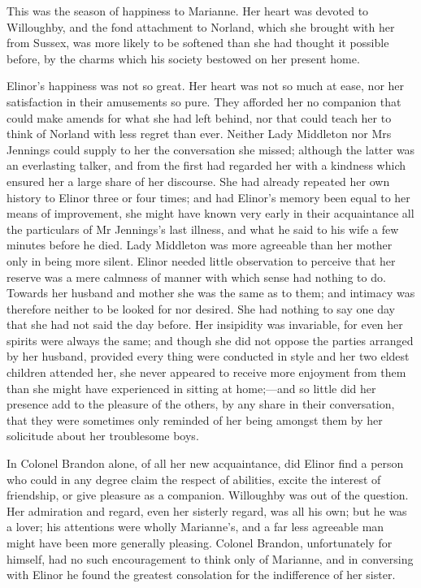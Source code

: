 This was the season of happiness to Marianne. Her heart was devoted to Willoughby, and the fond attachment to Norland, which she brought with her from Sussex, was more likely to be softened than she had thought it possible before, by the charms which his society bestowed on her present home.

Elinor's happiness was not so great. Her heart was not so much at ease, nor her satisfaction in their amusements so pure. They afforded her no companion that could make amends for what she had left behind, nor that could teach her to think of Norland with less regret than ever. Neither Lady Middleton nor Mrs Jennings could supply to her the conversation she missed; although the latter was an everlasting talker, and from the first had regarded her with a kindness which ensured her a large share of her discourse. She had already repeated her own history to Elinor three or four times; and had Elinor's memory been equal to her means of improvement, she might have known very early in their acquaintance all the particulars of Mr Jennings's last illness, and what he said to his wife a few minutes before he died. Lady Middleton was more agreeable than her mother only in being more silent. Elinor needed little observation to perceive that her reserve was a mere calmness of manner with which sense had nothing to do. Towards her husband and mother she was the same as to them; and intimacy was therefore neither to be looked for nor desired. She had nothing to say one day that she had not said the day before. Her insipidity was invariable, for even her spirits were always the same; and though she did not oppose the parties arranged by her husband, provided every thing were conducted in style and her two eldest children attended her, she never appeared to receive more enjoyment from them than she might have experienced in sitting at home;—and so little did her presence add to the pleasure of the others, by any share in their conversation, that they were sometimes only reminded of her being amongst them by her solicitude about her troublesome boys.

In Colonel Brandon alone, of all her new acquaintance, did Elinor find a person who could in any degree claim the respect of abilities, excite the interest of friendship, or give pleasure as a companion. Willoughby was out of the question. Her admiration and regard, even her sisterly regard, was all his own; but he was a lover; his attentions were wholly Marianne's, and a far less agreeable man might have been more generally pleasing. Colonel Brandon, unfortunately for himself, had no such encouragement to think only of Marianne, and in conversing with Elinor he found the greatest consolation for the indifference of her sister.

